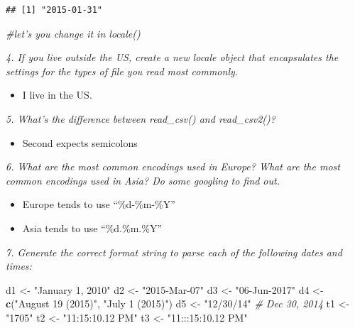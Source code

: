 \documentclass[]{book}
\newenvironment{Shaded}{\begin{snugshade}}{\end{snugshade}}
\newcommand{\CommentTok}[1]{\textcolor[rgb]{0.56,0.35,0.01}{\textit{#1}}}
\newcommand{\DataTypeTok}[1]{\textcolor[rgb]{0.13,0.29,0.53}{#1}}
\newcommand{\KeywordTok}[1]{\textcolor[rgb]{0.13,0.29,0.53}{\textbf{#1}}}
\newcommand{\NormalTok}[1]{#1}
\newcommand{\StringTok}[1]{\textcolor[rgb]{0.31,0.60,0.02}{#1}}
\providecommand{\tightlist}{%
  \setlength{\itemsep}{0pt}\setlength{\parskip}{0pt}}
\theoremstyle{definition}
\theoremstyle{definition}
\theoremstyle{definition}
\theoremstyle{remark}
\begin{document}
\begin{Shaded}
\end{Shaded}

\begin{verbatim}
## [1] "2015-01-31"
\end{verbatim}

\begin{Shaded}
\begin{Highlighting}[]
\CommentTok{#let's you change it in locale()}
\end{Highlighting}
\end{Shaded}

\emph{4. If you live outside the US, create a new locale object that
encapsulates the settings for the types of file you read most commonly.}

\begin{itemize}
\tightlist
\item
  I live in the US.
\end{itemize}

\emph{5. What's the difference between read\_csv() and read\_csv2()?}

\begin{itemize}
\tightlist
\item
  Second expects semicolons
\end{itemize}

\emph{6. What are the most common encodings used in Europe? What are the
most common encodings used in Asia? Do some googling to find out.}

\begin{itemize}
\tightlist
\item
  Europe tends to use ``\%d-\%m-\%Y''
\item
  Asia tends to use ``\%d.\%m.\%Y''
\end{itemize}

\emph{7. Generate the correct format string to parse each of the
following dates and times:}

\begin{Shaded}
\begin{Highlighting}[]
\NormalTok{d1 <-}\StringTok{ "January 1, 2010"}
\NormalTok{d2 <-}\StringTok{ "2015-Mar-07"}
\NormalTok{d3 <-}\StringTok{ "06-Jun-2017"}
\NormalTok{d4 <-}\StringTok{ }\KeywordTok{c}\NormalTok{(}\StringTok{"August 19 (2015)"}\NormalTok{, }\StringTok{"July 1 (2015)"}\NormalTok{)}
\NormalTok{d5 <-}\StringTok{ "12/30/14"} \CommentTok{# Dec 30, 2014}
\NormalTok{t1 <-}\StringTok{ "1705"}
\NormalTok{t2 <-}\StringTok{ "11:15:10.12 PM"}
\NormalTok{t3 <-}\StringTok{ "11:::15:10.12 PM"}
\end{Highlighting}
\end{Shaded}
\end{document}
